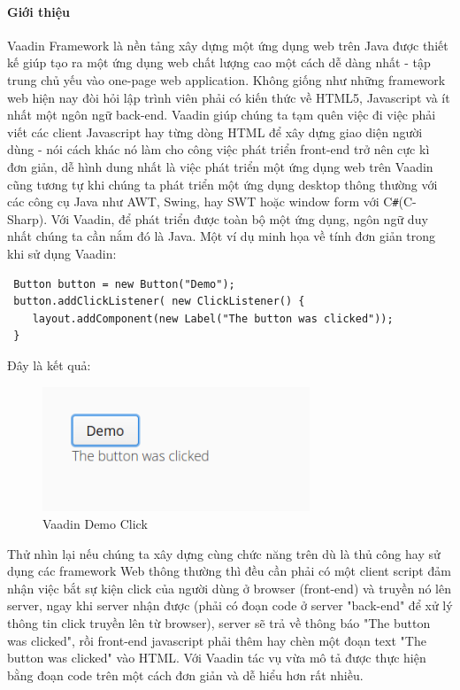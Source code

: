 \paragraph{Giới thiệu} Vaadin Framework là nền tảng xây dựng một ứng dụng web trên Java được thiết kế giúp tạo ra một ứng dụng web chất lượng cao một cách dễ dàng nhất - tập trung chủ yếu vào one-page web application. Không giống như những framework web hiện nay đòi hỏi lập trình viên phải có kiến thức về HTML5, Javascript và ít nhất một ngôn ngữ back-end. Vaadin giúp chúng ta tạm quên việc đi việc phải viết các client Javascript hay từng dòng HTML để xây dựng giao diện người dùng - nói cách khác nó làm cho công việc phát triển front-end trở nên cực kì đơn giản, dễ hình dung nhất là việc phát triển một ứng dụng web trên Vaadin cũng tương tự khi chúng ta phát triển một ứng dụng desktop thông thường với các công cụ Java như AWT, Swing, hay SWT hoặc window form với C\verb|#|(C-Sharp).  Với Vaadin, để phát triển được toàn bộ một ứng dụng, ngôn ngữ duy nhất chúng ta cần nắm đó là Java. Một ví dụ minh họa về tính đơn giản trong khi sử dụng Vaadin:
\begin{verbatim}
 Button button = new Button("Demo");
 button.addClickListener( new ClickListener() {
    layout.addComponent(new Label("The button was clicked"));
 }
\end{verbatim}
Đây là kết quả:
\begin{figure}[H]
 	\centering
 	\includegraphics[width=80mm]{Figures/vaadin_democlick.png}
 	\caption{Vaadin Demo Click\label{overflow}}
\end{figure}
Thử nhìn lại nếu chúng ta xây dựng cùng chức năng trên dù là thủ công hay sử dụng các framework Web thông thường thì đều cần phải có một client script đảm nhận việc bắt sự kiện click của người dùng ở browser (front-end) và truyền nó lên server, ngay khi server nhận được (phải có đoạn code ở server "back-end" để xử lý thông tin click truyền lên từ browser), server sẽ trả về thông báo "The button was clicked", rồi front-end javascript phải thêm hay chèn một đoạn text "The button was clicked" vào HTML. Với Vaadin tác vụ vừa mô tả được thực hiện bằng đoạn code trên một cách đơn giản và dễ hiểu hơn rất nhiều.
